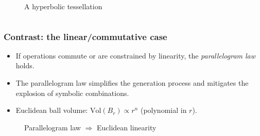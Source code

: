 \documentclass[aspectratio=169]{beamer}
\begin{document}
\begin{frame}
\begin{columns}
\begin{column}{0.3\textwidth}
\begin{figure}[ht]
                \caption{A hyperbolic tessellation}
            \end{figure}
        \end{column}
    \end{columns}
\end{frame}

\begin{frame}
    \frametitle{Contrast: the linear/commutative case}
    \begin{itemize}
        \item If operations commute or are constrained by linearity, the \emph{parallelogram law} holds.
        \item The parallelogram law simplifies the generation process and mitigates the explosion of symbolic combinations.
        \item Euclidean ball volume: $\mathrm{Vol}(B_r) \propto r^n$ (polynomial in $r$).
    \end{itemize}
    \begin{figure}[ht]\centering
        \caption{Parallelogram law $\Rightarrow$ Euclidean linearity}
    \end{figure}
\end{frame}
\end{document}
